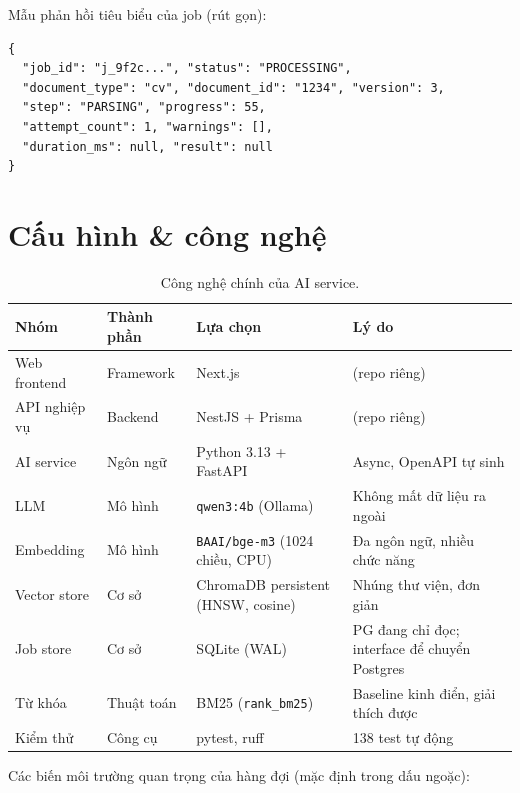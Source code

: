 \documentclass[a4paper,11pt]{article}
\begin{document}
Mẫu phản hồi tiêu biểu của job (rút gọn):

\begin{verbatim}
{
  "job_id": "j_9f2c...", "status": "PROCESSING",
  "document_type": "cv", "document_id": "1234", "version": 3,
  "step": "PARSING", "progress": 55,
  "attempt_count": 1, "warnings": [],
  "duration_ms": null, "result": null
}
\end{verbatim}

\section{Cấu hình \& công nghệ}

\begin{table}[htbp]
\centering\footnotesize
\begin{tabular}{@{}llll@{}}
\toprule
\textbf{Nhóm} & \textbf{Thành phần} & \textbf{Lựa chọn} & \textbf{Lý do} \\
\midrule
Web frontend & Framework & Next.js & (repo riêng) \\
API nghiệp vụ & Backend & NestJS + Prisma & (repo riêng) \\
AI service & Ngôn ngữ & Python 3.13 + FastAPI & Async, OpenAPI tự sinh \\
LLM & Mô hình & \texttt{qwen3:4b} (Ollama) & Không mất dữ liệu ra ngoài \\
Embedding & Mô hình & \texttt{BAAI/bge-m3} (1024 chiều, CPU) & Đa ngôn ngữ, nhiều chức năng \\
Vector store & Cơ sở & ChromaDB persistent (HNSW, cosine) & Nhúng thư viện, đơn giản \\
Job store & Cơ sở & SQLite (WAL) & PG đang chỉ đọc; interface để chuyển Postgres \\
Từ khóa & Thuật toán & BM25 (\texttt{rank\_bm25}) & Baseline kinh điển, giải thích được \\
Kiểm thử & Công cụ & pytest, ruff & 138 test tự động \\
\bottomrule
\end{tabular}
\caption{Công nghệ chính của AI service.}
\label{tab:stack}
\end{table}

Các biến môi trường quan trọng của hàng đợi (mặc định trong dấu ngoặc):
\end{document}

